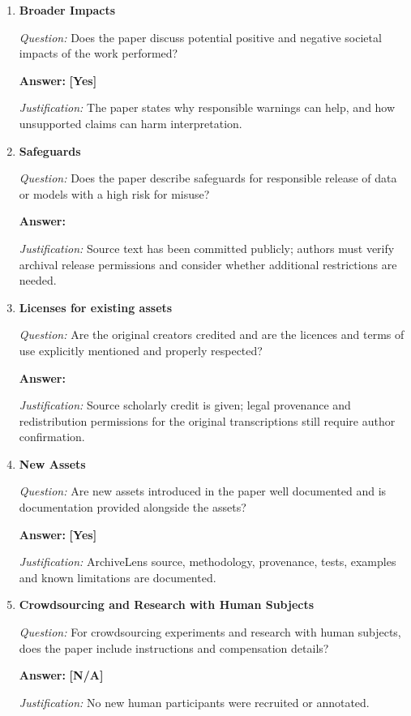 \begin{enumerate}
\item \textbf{Broader Impacts}\par\noindent\textit{Question:} Does the paper discuss potential positive and negative societal impacts of the work performed?\par\noindent\textbf{Answer:} \textbf{[Yes]}\par\noindent\textit{Justification:} The paper states why responsible warnings can help, and how unsupported claims can harm interpretation.\par

\item \textbf{Safeguards}\par\noindent\textit{Question:} Does the paper describe safeguards for responsible release of data or models with a high risk for misuse?\par\noindent\textbf{Answer:} \answerTODO{}\par\noindent\textit{Justification:} Source text has been committed publicly; authors must verify archival release permissions and consider whether additional restrictions are needed.\par

\item \textbf{Licenses for existing assets}\par\noindent\textit{Question:} Are the original creators credited and are the licences and terms of use explicitly mentioned and properly respected?\par\noindent\textbf{Answer:} \answerTODO{}\par\noindent\textit{Justification:} Source scholarly credit is given; legal provenance and redistribution permissions for the original transcriptions still require author confirmation.\par

\item \textbf{New Assets}\par\noindent\textit{Question:} Are new assets introduced in the paper well documented and is documentation provided alongside the assets?\par\noindent\textbf{Answer:} \textbf{[Yes]}\par\noindent\textit{Justification:} ArchiveLens source, methodology, provenance, tests, examples and known limitations are documented.\par

\item \textbf{Crowdsourcing and Research with Human Subjects}\par\noindent\textit{Question:} For crowdsourcing experiments and research with human subjects, does the paper include instructions and compensation details?\par\noindent\textbf{Answer:} \textbf{[N/A]}\par\noindent\textit{Justification:} No new human participants were recruited or annotated.\par


\end{enumerate}
